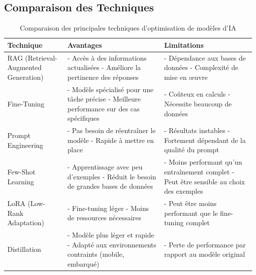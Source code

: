 \subsection{Comparaison des Techniques}
\begin{table}[h!]
	\caption{Comparaison des principales techniques d'optimisation de modèles d'IA}
	\centering
	\begin{tabular}{|p{3cm}|p{5cm}|p{5cm}|}
		\hline
		\textbf{Technique}                   & \textbf{Avantages}                                                                                  & \textbf{Limitations}                                                                              \\
		\hline
		RAG (Retrieval-Augmented Generation) & - Accès à des informations actualisées \newline - Améliore la pertinence des réponses               & - Dépendance aux bases de données \newline - Complexité de mise en œuvre                          \\
		\hline
		Fine-Tuning                          & - Modèle spécialisé pour une tâche précise \newline - Meilleure performance sur des cas spécifiques & - Coûteux en calculs \newline - Nécessite beaucoup de données                                     \\
		\hline
		Prompt Engineering                   & - Pas besoin de réentraîner le modèle \newline - Rapide à mettre en place                           & - Résultats instables \newline - Fortement dépendant de la qualité du prompt                      \\
		\hline
		Few-Shot Learning                    & - Apprentissage avec peu d'exemples \newline - Réduit le besoin de grandes bases de données         & - Moins performant qu'un entraînement complet \newline - Peut être sensible au choix des exemples \\
		\hline
		LoRA (Low-Rank Adaptation)           & - Fine-tuning léger \newline - Moins de ressources nécessaires                                      & - Peut être moins performant que le fine-tuning complet                                           \\
		\hline
		Distillation                         & - Modèle plus léger et rapide \newline - Adapté aux environnements contraints (mobile, embarqué)    & - Perte de performance par rapport au modèle original                                             \\
		\hline
	\end{tabular}
	\label{tab:comparaison-techniques}
\end{table}
\newpage
{}
